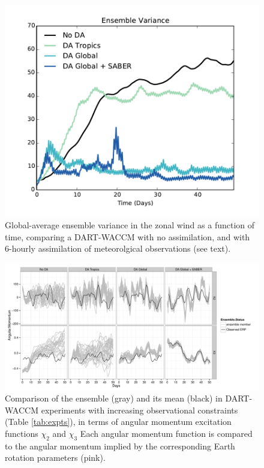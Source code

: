  \begin{figure}
	 \includegraphics[width=\textwidth]{Paper_figures/ERPDA_paper_evalvariable_state_space.pdf}
	 \caption{Global-average ensemble variance in the zonal wind as a function of time, comparing a DART-WACCM with no assimilation, and with 6-hourly assimilation of meteorolgical observations (see text).}
	 \label{fig:evalvariable_state}
\end{figure}
\begin{figure}
	 \includegraphics[width=\textwidth]{Paper_figures/ERPDA_paper_evalvariable_aam_space.pdf}
	 \caption{Comparison of the ensemble (gray) and its mean (black) in DART-WACCM experiments with increasing observational constraints (Table \ref{tab:expts}), in terms of angular momentum excitation functions $\chi_2$ and $\chi_3$ Each angular momentum function is compared to the angular momentum implied by the corresponding Earth rotation parameters (pink).}
	 \label{fig:evalvariable_aam}
\end{figure}
